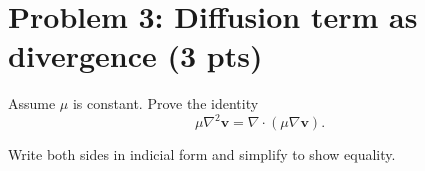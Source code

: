 \documentclass[11pt]{article}
\begin{document}
\section*{Problem 3: Diffusion term as divergence (3 pts)}

\noindent Assume $\mu$ is constant. Prove the identity
\[
\mu\nabla^2\mathbf{v}
=
\nabla\cdot(\mu\nabla\mathbf{v}).
\]

Write both sides in indicial form and simplify to show equality.

\vspace{1em}
\end{document}
